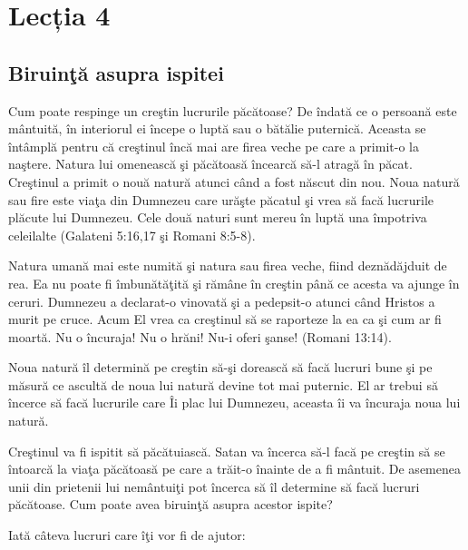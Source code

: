 \newpage

\section*{Lecția 4}

\subsection*{Biruinţă asupra ispitei}

Cum poate respinge un creştin lucrurile păcătoase? De îndată ce o persoană este mântuită, în interiorul ei începe o luptă sau o bătălie puternică. Aceasta se întâmplă pentru că creştinul încă mai are firea veche pe care a primit-o la naştere. Natura lui omenească şi păcătoasă încearcă să-l atragă în păcat. Creştinul a primit o nouă natură atunci când a fost născut din nou. Noua natură sau fire este viaţa din Dumnezeu care urăşte păcatul şi vrea să facă lucrurile plăcute lui Dumnezeu. Cele două naturi sunt mereu în luptă una împotriva celeilalte (Galateni 5:16,17 şi Romani 8:5-8).

Natura umană mai este numită şi natura sau firea veche, fiind deznădăjduit de rea. Ea nu poate fi îmbunătăţită şi rămâne în creştin până ce acesta va ajunge în ceruri. Dumnezeu a declarat-o vinovată şi a pedepsit-o atunci când Hristos a murit pe cruce. Acum El vrea ca creştinul să se raporteze la ea ca şi cum ar fi moartă. Nu o încuraja! Nu o hrăni! Nu-i oferi şanse! (Romani 13:14).

Noua natură îl determină pe creştin să-şi dorească să facă lucruri bune şi pe măsură ce ascultă de noua lui natură devine tot mai puternic. El ar trebui să încerce să facă lucrurile care Îi plac lui Dumnezeu, aceasta îi va încuraja noua lui natură.

Creştinul va fi ispitit să păcătuiască. Satan va încerca să-l facă pe creştin să se întoarcă la viaţa păcătoasă pe care a trăit-o înainte de a fi mântuit. De asemenea unii din prietenii lui nemântuiţi pot încerca să îl determine să facă lucruri păcătoase. Cum poate avea biruinţă asupra acestor ispite?

Iată câteva lucruri care îţi vor fi de ajutor:

